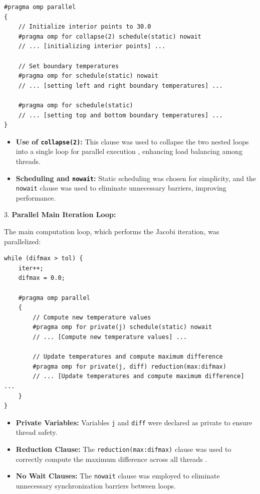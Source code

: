 \documentclass{article}
\begin{document}
\begin{lstlisting}[style=CStyle, caption={Parallel Initialization}]
#pragma omp parallel
{
    // Initialize interior points to 30.0
    #pragma omp for collapse(2) schedule(static) nowait
    // ... [initializing interior points] ...

    // Set boundary temperatures
    #pragma omp for schedule(static) nowait
    // ... [setting left and right boundary temperatures] ...

    #pragma omp for schedule(static)
    // ... [setting top and bottom boundary temperatures] ...
}
\end{lstlisting}

    \begin{itemize}
        \item \textbf{Use of \texttt{collapse(2)}:} This clause was used to collapse the two nested loops into a single loop for parallel execution \parencite{openmp}, enhancing load balancing among threads.
        \item \textbf{Scheduling and \texttt{nowait}:} Static scheduling was chosen for simplicity, and the \texttt{nowait} clause was used to eliminate unnecessary barriers, improving performance.
    \end{itemize}

3. \textbf{Parallel Main Iteration Loop:}

   The main computation loop, which performs the Jacobi iteration, was parallelized:

\begin{lstlisting}[style=CStyle, caption={Parallel Main Iteration Loop}]
while (difmax > tol) {
    iter++;
    difmax = 0.0;

    #pragma omp parallel
    {
        // Compute new temperature values
        #pragma omp for private(j) schedule(static) nowait
        // ... [Compute new temperature values] ...

        // Update temperatures and compute maximum difference
        #pragma omp for private(j, diff) reduction(max:difmax)
        // ... [Update temperatures and compute maximum difference] ...
    }
}
\end{lstlisting}

    \begin{itemize}
        \item \textbf{Private Variables:} Variables \texttt{j} and \texttt{diff} were declared as private to ensure thread safety.
        \item \textbf{Reduction Clause:} The \texttt{reduction(max:difmax)} clause was used to correctly compute the maximum difference across all threads \parencite{chapman2007openmp}.
        \item \textbf{No Wait Clauses:} The \texttt{nowait} clause was employed to eliminate unnecessary synchronization barriers between loops.
    \end{itemize}
\end{document}
